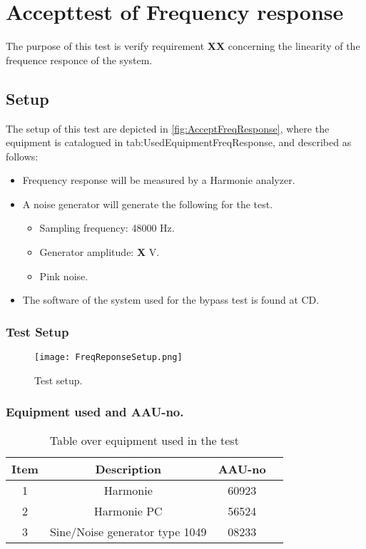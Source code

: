 \chapter{Accepttest of Frequency response}\label{app:journal_Frequency_Response}
The purpose of this test is verify requirement \textbf{XX} concerning the linearity of the frequence responce of the system.

\section{Setup}
The setup of this test are depicted in \autoref{fig:AcceptFreqResponse}, where the equipment is catalogued in tab:UsedEquipmentFreqResponse, and described as follows:

\begin{itemize}
\item Frequency response will be measured by a Harmonie analyzer.
\item A noise generator will generate the following for the test. 
\begin{itemize}
\item Sampling frequency: 48000 Hz.
\item Generator amplitude: \textbf{X} V.
\item Pink noise.
\end{itemize}
\item The software of the system used for the bypass test is found at CD. 

\end{itemize}


\subsection*{Test Setup}
\begin{figure}[H]
\centering
\texttt{[image: FreqReponseSetup.png]}
\label{fig:AcceptFreqResponse}
\caption{Test setup.}
\end{figure}

\subsection*{Equipment used and AAU-no.}

\begin{table}[H]
\centering
{}
\begin{tabular}{S[table-format=1]ccc} \toprule
    {Item} & {Description} & {AAU-no} \\       &  Harmonie  & 60923  \\ 
    2      &  Harmonie PC  & 56524  \\ 
    3      &  Sine/Noise generator type 1049  & 08233  \\  \bottomrule 
\end{tabular}
\caption{Table over equipment used in the test}
\label{tab:UsedEquipmentFreqResponse}
\end{table}
\vspace{-5mm}


